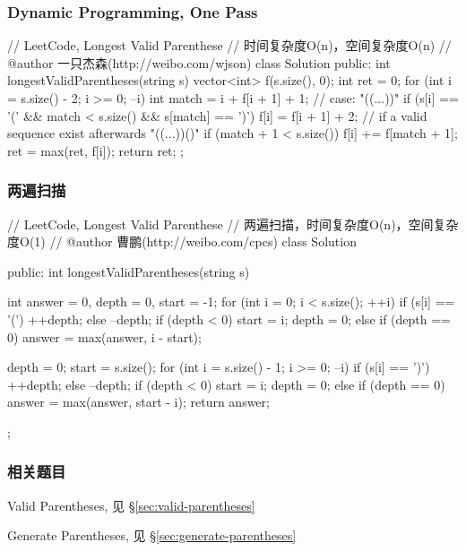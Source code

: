 \subsubsection{Dynamic Programming, One Pass}
\begin{Code}
// LeetCode, Longest Valid Parenthese
// 时间复杂度O(n)，空间复杂度O(n)
// @author 一只杰森(http://weibo.com/wjson)
class Solution {
public:
    int longestValidParentheses(string s) {
        vector<int> f(s.size(), 0);
        int ret = 0;
        for (int i = s.size() - 2; i >= 0; --i) {
            int match = i + f[i + 1] + 1;
            // case: "((...))"
            if (s[i] == '(' && match < s.size() && s[match] == ')') {
                f[i] = f[i + 1] + 2;
                // if a valid sequence exist afterwards "((...))()"
                if (match + 1 < s.size()) f[i] += f[match + 1];
            }
            ret = max(ret, f[i]);
        }
        return ret;
    }
};
\end{Code}


\subsubsection{两遍扫描}
\begin{Code}
// LeetCode, Longest Valid Parenthese
// 两遍扫描，时间复杂度O(n)，空间复杂度O(1)
// @author 曹鹏(http://weibo.com/cpcs)
class Solution {
public:
    int longestValidParentheses(string s) {
        int answer = 0, depth = 0, start = -1;
        for (int i = 0; i < s.size(); ++i) {
            if (s[i] == '(') {
                ++depth;
            } else {
                --depth;
                if (depth < 0) {
                    start = i;
                    depth = 0;
                } else if (depth == 0) {
                    answer = max(answer, i - start);
                }
            } 
        }

        depth = 0;
        start = s.size();
        for (int i = s.size() - 1; i >= 0; --i) {
            if (s[i] == ')') {
                ++depth;
            } else {
                --depth;
                if (depth < 0) {
                    start = i;
                    depth = 0;
                } else if (depth == 0) {
                    answer = max(answer, start - i);
                }
            } 
        }
        return answer;
    }
};
\end{Code}


\subsubsection{相关题目}
\begindot
\item Valid Parentheses, 见 \S \ref{sec:valid-parentheses}
\item Generate Parentheses, 见 \S \ref{sec:generate-parentheses}
\myenddot


